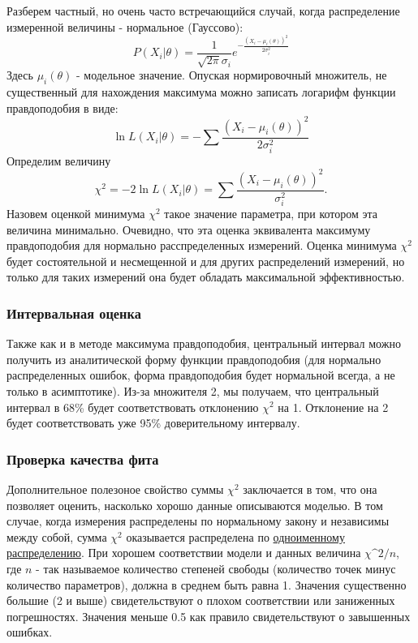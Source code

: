     Разберем частный, но очень часто встречающийся случай, когда
распределение измеренной величины - нормальное (Гауссово):
\begin{equation}
  P(X_i | \theta) = \frac{1}{\sqrt {2 \pi} \sigma_i} e^{- \frac{(X_i - \mu_i(\theta))^2}{2 \sigma_i^2}}
\end{equation} Здесь $\mu_i(\theta)$ - модельное значение. Опуская
нормировочный множитель, не существенный для нахождения максимума можно
записать логарифм функции правдоподобия в виде: \begin{equation}
  \ln L(X_i | \theta) = - \sum{\frac{(X_i - \mu_i(\theta))^2}{2 \sigma_i^2}}
\end{equation} Определим величину \begin{equation}
    \chi^2 = - 2 \ln L(X_i | \theta) =  \sum{\frac{(X_i - \mu_i(\theta))^2}{\sigma_i^2}}.
\end{equation} Назовем оценкой минимума $\chi^2$ такое значение
параметра, при котором эта величина минимально. Очевидно, что эта оценка
эквивалента максимуму правдоподобия для нормально расспределенных
измерений. Оценка минимума $\chi^2$ будет состоятельной и несмещенной
и для других распределений измерений, но только для таких измерений она
будет обладать максимальной эффективностью.

\subsubsection{Интервальная оценка}

Также как и в методе максимума правдоподобия, центральный интервал можно
получить из аналитической форму функции правдоподобия (для нормально
распределенных ошибок, форма правдоподобия будет нормальной всегда, а не
только в асимптотике). Из-за множителя 2, мы получаем, что центральный
интервал в 68\% будет соответствовать отклонению $\chi^2$ на 1.
Отклонение на 2 будет соответствовать уже 95\% доверительному интервалу.

\subsubsection{Проверка качества фита}

Дополнительное полезоное свойство суммы $\chi^2$ заключается в том,
что она позволяет оценить, насколько хорошо данные описываются моделью.
В том случае, когда измерения распределены по нормальному закону и
независимы между собой, сумма $\chi^2$ оказывается распределена по
\href{https://ru.wikipedia.org/wiki/\%D0\%A0\%D0\%B0\%D1\%81\%D0\%BF\%D1\%80\%D0\%B5\%D0\%B4\%D0\%B5\%D0\%BB\%D0\%B5\%D0\%BD\%D0\%B8\%D0\%B5_\%D1\%85\%D0\%B8-\%D0\%BA\%D0\%B2\%D0\%B0\%D0\%B4\%D1\%80\%D0\%B0\%D1\%82}{одноименному
распределению}. При хорошем соответствии модели и данных величина
$\chi\^{}2 / n $, где $n$ - так называемое количество степеней
свободы (количество точек минус количество параметров), должна в среднем
быть равна 1. Значения существенно большие (2 и выше) свидетельствуют о
плохом соответствии или заниженных погрешностях. Значения меньше 0.5 как
правило свидетельствуют о завышенных ошибках.


